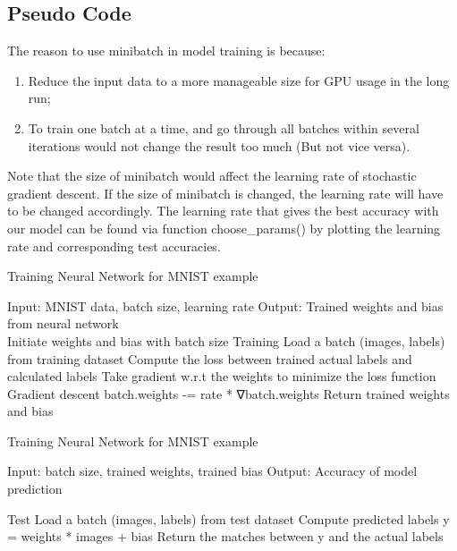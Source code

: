 \documentclass[10pt]{article}
\begin{document}
\subsection{Pseudo Code}

The reason to use minibatch in model training is because:
\begin{enumerate}
    \item Reduce the input data to a more manageable size for GPU usage in the long run;
    \item To train one batch at a time, and go through all batches within several iterations would not change the result too much (But not vice versa).
\end{enumerate}

Note that the size of minibatch would affect the learning rate of stochastic gradient descent. If the size of minibatch is changed, the learning rate will have to be changed accordingly. The learning rate that gives the best accuracy with our model can be found via function choose\_params() by plotting the learning rate and corresponding test accuracies.

\begin{algorithm}[ht]
\caption{Training Neural Network for MNIST example}
    \begin{algorithmic}[1]
        \State Input: MNIST data, batch size, learning rate
        \State Output: Trained weights and bias from neural network \\
        \State Initiate weights and bias with batch size
         {Training}
            \State Load a batch (images, labels) from training dataset
            \State Compute the loss between trained actual labels and calculated labels
            \State Take gradient w.r.t the weights to minimize the loss function
            \State Gradient descent batch.weights -= rate * ∇batch.weights
                \State Return trained weights and bias
            \EndIf
        \EndProcedure
    \end{algorithmic}
\end{algorithm}

\begin{algorithm}[ht]
\caption{Training Neural Network for MNIST example}
    \begin{algorithmic}[1]
        \State Input: batch size, trained weights, trained bias
        \State Output: Accuracy of model prediction

         {Test}
            \State Load a batch (images, labels) from test dataset
            \State Compute predicted labels y = weights * images + bias
            \State Return the matches between y and the actual labels
        \EndProcedure
    \end{algorithmic}
\end{algorithm}
\end{document}
